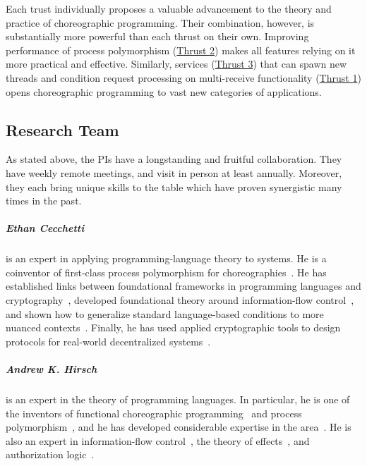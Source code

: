 \smallskip

Each trust individually proposes a valuable advancement to the theory and practice of choreographic programming.
Their combination, however, is substantially more powerful than each thrust on their own.
Improving performance of process polymorphism (\hyperref[sec:t2]{Thrust 2}) makes all features relying on it more practical and effective.
Similarly, services (\hyperref[sec:t3]{Thrust 3}) that can spawn new threads and condition request processing on multi-receive functionality (\hyperref[sec:t1]{Thrust 1})
opens choreographic programming to vast new categories of applications.

\subsection{Research Team}

As stated above, the PIs have a longstanding and fruitful collaboration.
They have weekly remote meetings, and visit in person at least annually.
Moreover, they each bring unique skills to the table which have proven synergistic many times in the past.

\subparagraph{Ethan Cecchetti} is an expert in applying programming-language theory to systems.
He is a coinventor of first-class process polymorphism for choreographies~\citep{SamuelsonHC25}.
He has established links between foundational frameworks in programming languages and cryptography~\citep{KuennemannPC24,PatrignaniKWC24},
developed foundational theory around information-flow control~\citep{HirschACAT20,HirschC21,SilverHCHZ23},
and shown how to generalize standard language-based conditions to more nuanced contexts~\citep{CecchettiMA17,CecchettiYNM21,Cecchetti25}.
Finally, he has used applied cryptographic tools to design protocols for real-world decentralized systems~\citep{ZhangCCJS16,CecchettiZJKJS17,CrooksBCHAA18,CecchettiFMJ19}.

\subparagraph{Andrew K. Hirsch} is an expert in the theory of programming languages.
In particular, he is one of the inventors of functional choreographic programming~\cite{HirschG22} and process polymorphism~\cite{GraversenHM24}, and he has developed considerable expertise in the area~\cite{SamuelsonHC25,GraversenHM24,HirschG22,BohosianH25}.
He is also an expert in information-flow control~\cite{SilverHCHZ23,MenzHLG23,HirschC21,HirschACAT20}, the theory of effects~\cite{SilverHCHZ23,HirschC21,HirschT18}, and authorization logic~\cite{HirschACAT20,HirschC13}.

